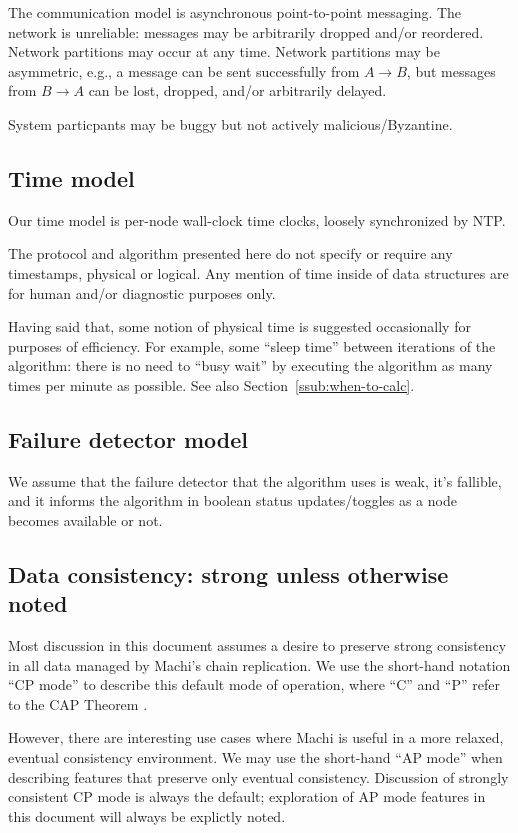 \documentclass[preprint,10pt]{sigplanconf}
\begin{document}
The communication model is asynchronous point-to-point messaging.
The network is unreliable: messages may be arbitrarily dropped and/or
reordered.  Network partitions may occur at any time.
Network partitions may be asymmetric, e.g., a message can be sent successfully
from $A \rightarrow B$, but messages from $B \rightarrow A$ can be
lost, dropped, and/or arbitrarily delayed.

System particpants may be buggy but not actively malicious/Byzantine.

\subsection{Time model}
\label{sub:time-model}

Our time model is per-node wall-clock time clocks, loosely
synchronized by NTP.

The protocol and algorithm presented here do not specify or require any
timestamps, physical or logical.  Any mention of time inside of data
structures are for human and/or diagnostic purposes only.

Having said that, some notion of physical time is suggested
occasionally for
purposes of efficiency.  For example, some ``sleep
time'' between iterations of the algorithm: there is no need to ``busy
wait'' by executing the algorithm as many times per minute as
possible.
See also Section~\ref{ssub:when-to-calc}.

\subsection{Failure detector model}

We assume that the failure detector that the algorithm uses is weak,
it's fallible, and it informs the algorithm in boolean status
updates/toggles as a node becomes available or not.

\subsection{Data consistency: strong unless otherwise noted}

Most discussion in this document assumes a desire to preserve strong
consistency in all data managed by Machi's chain replication.  We
use the short-hand notation ``CP mode'' to describe this default mode
of operation, where ``C'' and ``P'' refer to the CAP Theorem
\cite{cap-theorem}.

However, there are interesting use cases where Machi is useful in a
more relaxed, eventual consistency environment.  We may use the
short-hand ``AP mode'' when describing features that preserve only
eventual consistency.  Discussion of strongly consistent CP
mode is always the default; exploration of AP mode features in this document
will always be explictly noted.
\end{document}

